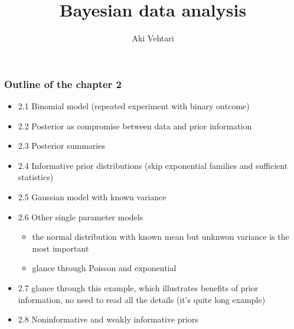\documentclass[english,t]{beamer}
\title[]{Bayesian data analysis}
\subtitle{}
\author{Aki Vehtari}
\institute[  Aalto]{}
\begin{document}
 

 \begin{frame}

   \frametitle{Outline of the chapter 2}

  \begin{itemize}
\item 2.1 Binomial model (repeated experiment with binary outcome)
\item 2.2 Posterior as compromise between data and prior information
\item 2.3 Posterior summaries
\item 2.4 Informative prior distributions (skip exponential families and sufficient statistics)
\item 2.5 Gaussian model with known variance
\item 2.6 Other single parameter models
  \begin{itemize}
  \item the normal distribution with known mean but
    unknwon variance is the most important
  \item glance through Poisson and exponential
  \end{itemize}
\item 2.7 glance through this example, which illustrates benefits of prior information, no need to read all the details (it's quite long example)
\item 2.8 Noninformative and weakly informative priors
\end{itemize}

\end{frame}
\end{document}
